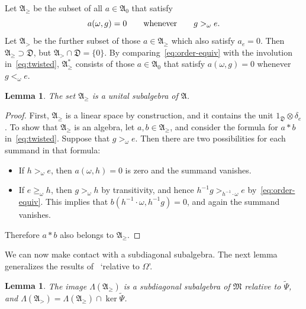 \documentclass[12pt,a4paper]{article}
\numberwithin{equation}{section}
\newtheorem{lem}[thm]{Lemma}
\theoremstyle{remark}
\newcommand{\A}{\mathfrak{A}}
\newcommand{\frD}{\mathfrak{D}}
\newcommand{\M}{\mathfrak{M}}
\renewcommand{\L}{\Lambda}
\renewcommand{\t}[1]{\widetilde{#1}}
\begin{document}
Let $\A_\ge$ be the subset of all $a \in \A_0$ that satisfy
\begin{equation}\label{eq:finite-sums-2}
a(\omega,g) = 0 \qquad \hbox{whenever} \qquad g >_\omega e.
\end{equation}
Let $\A_>$ be the further subset of those $a \in \A_\ge$ which also satisfy $a_e = 0$.  Then $\A_\ge \supset \frD$, but $\A_> \cap \frD = \{0\}$.  By comparing~\eqref{eq:order-equiv} with the involution in~\eqref{eq:twisted}, $\A_\ge^\ast$ consists of those $a \in \A_0$ that satisfy $a(\omega,g) = 0$ whenever $g <_\omega e$.

\begin{lem}\label{lem:subalg}
The set $\A_\ge$ is a unital subalgebra of $\A$.
\end{lem}

\begin{proof}
First, $\A_\ge$ is a linear space by construction, and it contains the unit $1_\frD \otimes \delta_e$.  To show that $\A_\ge$ is an algebra, let $a,b \in \A_\ge$, and consider the formula for $a\ast b$ in~\eqref{eq:twisted}.  Suppose that $g >_\omega e$.  Then there are two possibilities for each summand in that formula:
\begin{itemize}
\item If $h >_\omega e$, then $a(\omega,h) = 0$ is zero and the summand vanishes.
\item If $e \ge_\omega h$, then $g >_\omega h$ by transitivity, and hence $h^{-1}g >_{h^{-1}\cdot \omega} e$ by~\eqref{eq:order-equiv}.  This implies that $b(h^{-1}\cdot \omega,h^{-1}g) = 0$, and again the summand vanishes.
\end{itemize}
Therefore $a\ast b$ also belongs to $\A_\ge$.
\end{proof}

We can now make contact with a subdiagonal subalgebra.  The next lemma generalizes the results of~\cite[Subsec. 3.2]{Arv67} `relative to $\Omega$'.

\begin{lem}\label{lem:subdiag}
The image $\L(\A_\ge)$ is a subdiagonal subalgebra of $\M$ relative to $\t{\Psi}$, and $\L(\A_>) = \L(\A_\ge) \cap \ker \t{\Psi}$. 
\end{lem}
\end{document}
